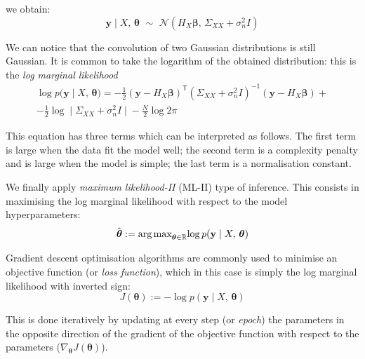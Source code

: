 \noindent
we obtain:
\begin{equation}
    \mathbf{y}\;\vert\; X,\,\boldsymbol{\theta}\,\,\sim\,\,\mathcal{N}(H_{X}\boldsymbol{\beta},\,\Sigma_{XX}+\sigma_n^2I)
\end{equation}

\noindent
We can notice that the convolution of two Gaussian distributions is still Gaussian. It is common to take the logarithm of the obtained distribution: this is the \textit{log marginal likelihood}
\begin{equation}\label{eq:logmarginallikelihood}
\begin{split}
    \log{p(\mathbf{y}\;\vert\; X,\,\boldsymbol{\theta}}) = -\frac{1}{2}(\mathbf{y}-H_X\boldsymbol{\beta})^\mathsf{T}(\Sigma_{XX}+\sigma_n^2I)^{-1}(\mathbf{y}-H_X\boldsymbol{\beta}) + \\ -\frac{1}{2}\log{\;\vert\; \Sigma_{XX}+\sigma_n^2I\;\vert\; } - \frac{N}{2}\log{2\pi}
\end{split}
\end{equation}

\noindent
This equation has three terms which can be interpreted as follows. The first term is large when the data fit the model well; the second term is a complexity penalty and is large when the model is simple; the last term is a normalisation constant.

\vspace{0.2cm}
We finally apply \textit{maximum likelihood-II} (ML-II) type of inference. This consists in maximising the log marginal likelihood with respect to the model hyperparameters:
%
\begin{equation}
    \hat{\boldsymbol{\theta}} := \textrm{arg\,max}_{\boldsymbol{\theta}\in\mathbb{R}}{\log{p(\mathbf{y}\;\vert\; X,\,\boldsymbol{\theta})}}
\end{equation}

\noindent
Gradient descent optimisation algorithms are commonly used  to minimise an objective function (or \textit{loss function}), which in this case is simply the log marginal likelihood with inverted sign:
%
\begin{equation}
    J(\boldsymbol{\theta}) := -\log{p(\mathbf{y}\;\vert\; X,\,\boldsymbol{\theta})}
\end{equation}

\noindent
This is done iteratively by updating at every step (or \textit{epoch}) the parameters in the opposite direction of the gradient of the objective function with respect to the parameters ($\nabla_{\boldsymbol{\theta}}J(\boldsymbol{\theta})$).


